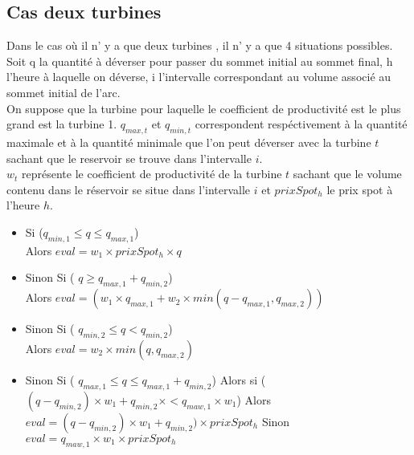 \documentclass[a4paper]{report}
\begin{document}
\subsection{Cas deux turbines}
Dans le cas où il n' y a que deux turbines , il n' y a que 4 situations possibles.\\
Soit q la quantité à déverser pour passer du sommet initial au sommet final, h l'heure à laquelle on déverse, i l'intervalle correspondant au volume associé au sommet initial de l'arc.\\
On suppose que la turbine pour laquelle le coefficient de productivité est le plus grand est la turbine 1. $q_{max,t}$ et $q_{min,t}$ correspondent respéctivement à la quantité maximale et à la quantité minimale que l'on peut déverser avec la turbine $t$ sachant que le reservoir se trouve dans l'intervalle $i$.\\
$w_t$ représente le coefficient de productivité de la turbine $t$ sachant que le volume contenu dans le réservoir se situe dans l'intervalle $i$ et $prixSpot_h$ le prix spot à l'heure $h$.\\
\begin{itemize}
  \item Si ($q_{min,1}\leq q \leq q_{max,1}$)\\
  \subitem Alors $eval = w_1 \times prixSpot_h \times q$\\
  \item Sinon Si ( $q\geq q_{max,1}+q_{min,2}$)\\
  \subitem Alors $eval=(w_1 \times q_{max,1} + w_2 \times min(q- q_{max,1},q_{max,2}))$\\
  \item Sinon Si ( $q_{min,2}\leq q  < q_{min,2}$)\\
  \subitem  Alors $eval= w_2 \times min(q,q_{max,2})$
 \item Sinon Si ( $q_{max,1} \leq q \leq q_{max,1} + q_{min,2}$)
 \subitem Alors si ( $(q-q_{min,2})\times w_1 + q_{min,2}\times < q_{maw,1}\times w_1$)
\subsubitem Alors $eval= (q-q_{min,2})\times w_1 + q_{min,2})\times prixSpot_h$
\subitem Sinon $eval = q_{maw,1}\times w_1\times prixSpot_h$
\end{itemize}
\end{document}
